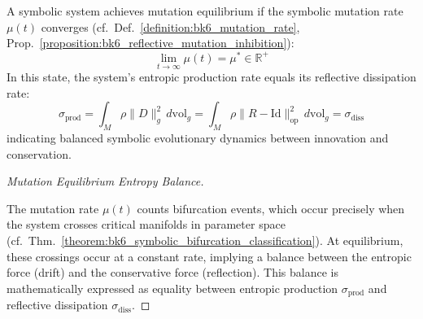 \begin{proposition}
\label{proposition:bk6_mutation_equilibrium}
A symbolic system achieves mutation equilibrium if the symbolic mutation rate $\mu(t)$ converges (cf.~Def.~\ref{definition:bk6_mutation_rate}, Prop.~\ref{proposition:bk6_reflective_mutation_inhibition}):
\begin{equation}
\lim_{t \to \infty} \mu(t) = \mu^* \in \mathbb{R}^+
\end{equation}
In this state, the system's entropic production rate equals its reflective dissipation rate:
\begin{equation}
\sigma_{\text{prod}} = \int_M \rho \|D\|_g^2 \, d\text{vol}_g = \int_M \rho \|R - \text{Id}\|_{\text{op}}^2 \, d\text{vol}_g = \sigma_{\text{diss}}
\end{equation}
indicating balanced symbolic evolutionary dynamics between innovation and conservation.
\begin{proof}[Mutation Equilibrium Entropy Balance]
\label{proof:bk6_mutation_equilibrium_entropy_balance}
\leavevmode

The mutation rate $\mu(t)$ counts bifurcation events, which occur precisely when the system crosses critical manifolds in parameter space (cf.~Thm.~\ref{theorem:bk6_symbolic_bifurcation_classification}). At equilibrium, these crossings occur at a constant rate, implying a balance between the entropic force (drift) and the conservative force (reflection). This balance is mathematically expressed as equality between entropic production $\sigma_{\text{prod}}$ and reflective dissipation $\sigma_{\text{diss}}$.
\end{proof}
\end{proposition}
